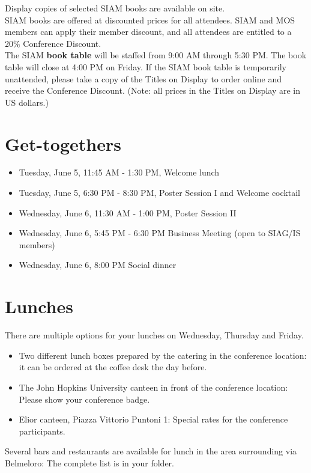 Display copies of selected SIAM books are available on site. \\
\noindent SIAM books are offered at discounted prices for all attendees. 
SIAM and MOS members can apply their member discount, and all attendees are entitled to a 20\% Conference Discount. \\
\noindent The SIAM \textbf{book table} will be staffed from 9:00 AM through 5:30 PM. 
The book table will close at 4:00 PM on Friday. 
If the SIAM book table is temporarily unattended, please take a copy of the Titles on Display to order online and receive the Conference Discount. 
(Note: all prices in the Titles on Display are in US dollars.)   

\section*{Get-togethers}

\begin{itemize}
  \item[] Tuesday, June 5, 11:45 AM - 1:30 PM, Welcome lunch
  \item[] Tuesday, June 5, 6:30 PM - 8:30 PM, Poster Session I and Welcome cocktail
  \item[] Wednesday, June 6, 11:30 AM - 1:00 PM, Poster Session II
  \item[] Wednesday, June 6, 5:45 PM - 6:30 PM Business Meeting (open to SIAG/IS members)
  \item[] Wednesday, June 6, 8:00 PM Social dinner
\end{itemize}

\section*{Lunches}
There are multiple options for your lunches on Wednesday, Thursday and Friday. 
\begin{itemize}
  \item[] Two different lunch boxes prepared by the catering in the conference location: it can be ordered at the coffee desk the day before.
  \item[] The John Hopkins University canteen in front of the conference location: Please show your conference badge.
  \item[] Elior canteen, Piazza Vittorio Puntoni 1: Special rates for the conference participants.
\end{itemize}
Several bars and restaurants are available for lunch in the area surrounding via Belmeloro: The complete list is in your folder.

